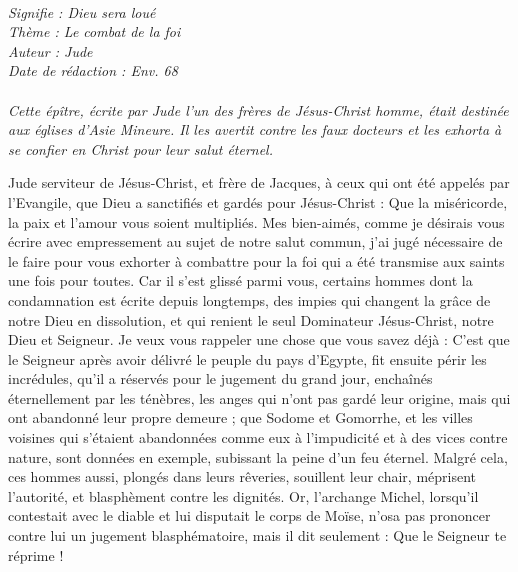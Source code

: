 \BFont
\noindent\hrulefill
{\footnotesize
\textit{
\bigskip
{\centering{}
\\Signifie : Dieu sera loué
\\Thème : Le combat de la foi
\\Auteur : Jude
\\Date de rédaction : Env. 68\\}
}
\textit{
\\Cette épître, écrite par Jude l’un des frères de Jésus-Christ homme, était destinée aux églises d’Asie Mineure. Il les avertit contre les faux docteurs et les exhorta à se confier en Christ pour leur salut éternel.\bigskip
}
}
\par\nobreak\noindent\hrulefill
\begin{multicols}{2}
\TextTitle{[Introduction]}
\VerseOne{}Jude serviteur de Jésus-Christ, et frère de Jacques, à ceux qui ont été appelés par l'Evangile, que Dieu a sanctifiés et gardés pour Jésus-Christ :
Que la miséricorde, la paix et l'amour vous soient multipliés.
Mes bien-aimés, comme je désirais vous écrire avec empressement au sujet de notre salut commun, j’ai jugé nécessaire de le faire pour vous exhorter à combattre pour la foi qui a été transmise aux saints une fois pour toutes.
Car il s’est glissé parmi vous, certains hommes dont la condamnation est écrite depuis longtemps, des impies qui changent la grâce de notre Dieu en dissolution, et qui renient le seul Dominateur Jésus-Christ, notre Dieu et Seigneur.
Je veux vous rappeler une chose que vous savez déjà : C'est que le Seigneur après avoir délivré le peuple du pays d'Egypte, fit ensuite périr les incrédules,
qu’il a réservés pour le jugement du grand jour, enchaînés éternellement par les ténèbres, les anges qui n'ont pas gardé leur origine, mais qui ont abandonné leur propre demeure ;
que Sodome et Gomorrhe, et les villes voisines qui s'étaient abandonnées comme eux à l'impudicité et à des vices contre nature, sont données en exemple, subissant la peine d’un feu éternel.
Malgré cela, ces hommes aussi, plongés dans leurs rêveries, souillent leur chair, méprisent l’autorité, et blasphèment contre les dignités.
Or, l'archange Michel, lorsqu’il contestait avec le diable et lui disputait le corps de Moïse, n'osa pas prononcer contre lui un jugement blasphématoire, mais il dit seulement : Que le Seigneur te réprime !

\end{multicols}
